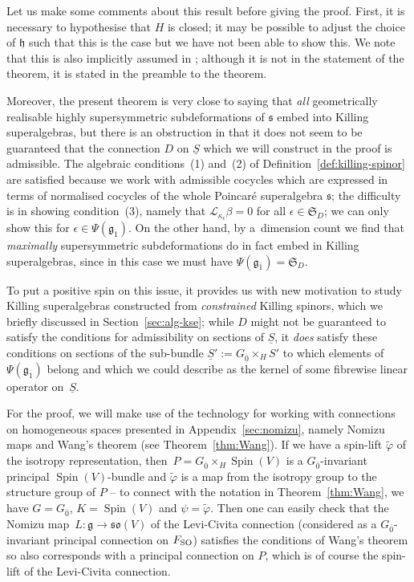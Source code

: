 \documentclass[pdftex]{sigma}
\numberwithin{equation}{section}
\newcommand{\fg}{\mathfrak{g}}
\newcommand{\fh}{\mathfrak{h}}
\newcommand{\fs}{\mathfrak{s}}
\newcommand{\fso}{\mathfrak{so}}
\newcommand{\fS}{\mathfrak{S}}
\newcommand{\eL}{\mathscr{L}}
\newcommand{\Sbundle}{\underline{S}}
\newcommand{\1}{\mathbbm{1}}
\DeclareMathOperator{\Spin}{Spin}
\begin{document}
\begin{Remark}
	Let us make some comments about this result before giving the proof. First, it is necessary to hypothesise that $H$ is closed; it may be possible to adjust the choice of $\fh$ such that this is the case but we have not been able to show this. We note that this is also implicitly assumed in \cite[Theorem~13]{Figueroa-OFarrill2017_1}; although it is not in the statement of the theorem, it is stated in the preamble to the theorem.
	
	Moreover, the present theorem is very close to saying that \emph{all} geometrically realisable highly supersymmetric subdeformations of $\fs$ embed into Killing superalgebras, but there is an obstruction in that it does not seem to be guaranteed that the connection $D$ on $\Sbundle$ which we will construct in the proof is admissible. The algebraic conditions~(1) and~(2) of Definition~\ref{def:killing-spinor} are satisfied because we work with admissible cocycles which are expressed in terms of normalised cocycles of the whole Poincar\'e superalgebra $\fs$; the difficulty is in showing condition~(3), namely that $\eL_{\kappa_\epsilon}\beta=0$ for all $\epsilon\in\fS_D$; we can only show this for $\epsilon\in\Psi(\fg_{\overline 1})$. On the other hand, by a~dimension count we find that \emph{maximally} supersymmetric subdeformations do in fact embed in Killing superalgebras, since in this case we must have $\Psi(\fg_{\overline 1})=\fS_D$.
	
	To put a positive spin on this issue, it provides us with new motivation to study Killing superalgebras constructed from \emph{constrained} Killing spinors, which we briefly discussed in Section~\ref{sec:alg-kse}; while $D$ might not be guaranteed to satisfy the conditions for admissibility on sections of $\Sbundle$, it \emph{does} satisfy these conditions on sections of the sub-bundle $\Sbundle':=G_{\overline0}\times_H S'$ to which elements of~$\Psi(\fg_{\overline 1})$ belong and which we could describe as the kernel of some fibrewise linear operator on~$\Sbundle$.
\end{Remark}

For the proof, we will make use of the technology for working with connections on homogeneous spaces presented in Appendix~\ref{sec:nomizu}, namely Nomizu maps and Wang's theorem (see Theorem~\ref{thm:Wang}). If we have a spin-lift $\tilde\varphi$ of the isotropy representation, then~${P=G_{\overline0}\times_H\Spin(V)}$ is a $G_{\overline0}$-invariant principal $\Spin(V)$-bundle and $\tilde\varphi$ is a map from the isotropy group to the structure group of $P$ -- to connect with the notation in Theorem~\ref{thm:Wang}, we have $G=G_{\overline 0}$, $K=\Spin(V)$ and $\psi=\tilde\varphi$. Then one can easily check that the Nomizu map~${L\colon \fg\to\fso(V)}$ of the Levi-Civita connection (considered as a $G_{\overline0}$-invariant principal connection on $F_{\rm SO}$) satisfies the conditions of Wang's theorem so also corresponds with a principal connection on $P$, which is of course the spin-lift of the Levi-Civita connection.
\end{document}
